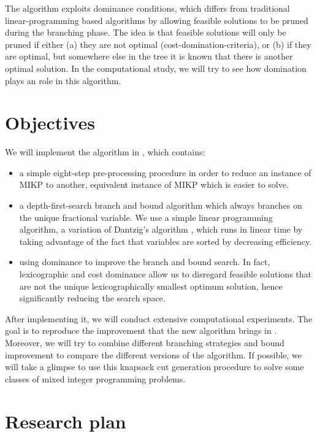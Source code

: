 \documentclass[a4paper,10pt]{article}
\begin{document}
The algorithm exploits dominance conditions, which differs from traditional linear-programming based algorithms by allowing feasible solutions to be pruned during the branching phase. The idea is that feasible solutions will only be pruned if either (a) they are not optimal (cost-domination-criteria), or (b) if they are optimal, but somewhere else in the tree it is known that there is another optimal solution. In the computational study, we will try to see how  domination plays an role in this algorithm.


\section{Objectives}
We will implement the algorithm in \cite{fukasawa2011exact}, which contains:
\begin{itemize}
\item a simple eight-step pre-processing procedure in order to reduce an instance of MIKP to another, equivalent
instance of MIKP which is easier to solve.
\item a depth-first-search branch and bound algorithm which always branches on the unique fractional variable. We use a simple linear programming algorithm, a variation of Dantzig’s algorithm \cite{dantzig1957discrete}, which runs in linear time by taking advantage of the fact that variables are sorted by decreasing efficiency.
\item using dominance to improve the branch and bound search. In fact, lexicographic and cost dominance allow us to disregard feasible solutions that are not the unique lexicographically smallest optimum solution, hence significantly reducing the search space.
\end{itemize}
After implementing it, we will conduct extensive computational experiments. The goal is to reproduce the improvement that the new algorithm brings in \cite{fukasawa2011exact}. Moreover, we will try to combine different branching strategies and bound improvement to compare the different versions of the algorithm. If possible, we will take a glimpse to use this knapsack cut generation procedure to solve some classes of mixed integer programming problems.


\section{Research plan}

 


 
\end{document}
